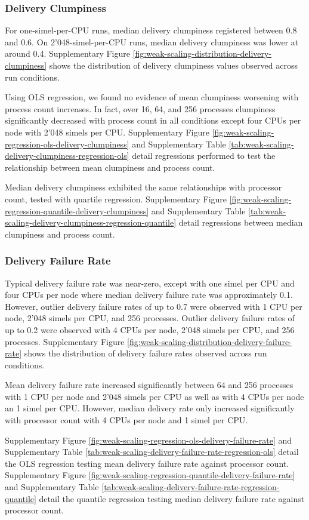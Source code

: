 \subsubsection{Delivery Clumpiness}

For one-simel-per-CPU runs, median delivery clumpiness registered between 0.8 and 0.6.
On 2'048-simel-per-CPU runs, median delivery clumpiness was lower at around 0.4.
Supplementary Figure \ref{fig:weak-scaling-distribution-delivery-clumpiness}
shows the distribution of delivery clumpiness values observed across run conditions.

Using OLS regression, we found no evidence of mean clumpiness worsening with process count increases.
In fact, over 16, 64, and 256 processes clumpiness significantly decreased with process count in all conditions except four CPUs per node with 2'048 simels per CPU.
Supplementary Figure \ref{fig:weak-scaling-regression-ols-delivery-clumpiness} and Supplementary Table \ref{tab:weak-scaling-delivery-clumpiness-regression-ols} detail regressions performed to test the relationship between mean clumpiness and process count.

Median delivery clumpiness exhibited the same relationships with processor count, tested with quartile regression.
Supplementary Figure \ref{fig:weak-scaling-regression-quantile-delivery-clumpiness} and Supplementary Table \ref{tab:weak-scaling-delivery-clumpiness-regression-quantile} detail regressions between median clumpiness and process count.

\subsubsection{Delivery Failure Rate}

Typical delivery failure rate was near-zero, except with one simel per CPU and four CPUs per node where median delivery failure rate was approximately 0.1.
However, outlier delivery failure rates of up to 0.7 were observed with 1 CPU per node, 2'048 simels per CPU, and 256 processes.
Outlier delivery failure rates of up to 0.2 were observed with 4 CPUs per node, 2'048 simels per CPU, and 256 processes.
Supplementary Figure \ref{fig:weak-scaling-distribution-delivery-failure-rate} shows the distribution of delivery failure rates observed across run conditions.

Mean delivery failure rate increased significantly between 64 and 256 processes with 1 CPU per node and 2'048 simels per CPU as well as with 4 CPUs per node an 1 simel per CPU.
However, median delivery rate only increased significantly with processor count with 4 CPUs per node and 1 simel per CPU.

Supplementary Figure \ref{fig:weak-scaling-regression-ols-delivery-failure-rate} and Supplementary Table \ref{tab:weak-scaling-delivery-failure-rate-regression-ols} detail the OLS regression testing mean delivery failure rate against processor count.
Supplementary Figure \ref{fig:weak-scaling-regression-quantile-delivery-failure-rate} and Supplementary Table \ref{tab:weak-scaling-delivery-failure-rate-regression-quantile} detail the quantile regression testing median delivery failure rate against processor count.
